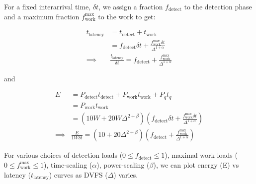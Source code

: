 For a fixed interarrival time, $\delta t$, we assign a fraction $f_{\text{detect}}$ to the detection phase and a maximum fraction $f_{\text{work}}^{\text{max}}$ to the work to get:

\begin{equation}
\begin{split}
    t_{\text{latency}} &= t_{\text{detect}} + t_{\text{work}} \\
    &= f_{\text{detect}}\delta t + \frac{f_{\text{work}}^{\text{max}}\delta t}{\Delta^{1+\alpha}}  \\
\implies & \boxed{\frac{t_{\text{latency}}}{\delta t} = f_{\text{detect}} + \frac{f_{\text{work}}^{\text{max}}}{\Delta^{1+\alpha}}}
\end{split}
\end{equation}

and

\begin{equation}
\begin{split}
    E &= P_\text{detect} t_{\text{detect}} + P_{\text{work}}  t_{\text{work}} + P_q t_q \\
    &= P_{\text{work}}  t_{\text{work}} \\
    &= (10W + 20W \Delta^{2+\beta}) (f_{\text{detect}}\delta t + \frac{f_{\text{work}}^{\text{max}}\delta t}{\Delta^{1+\alpha}}) \\
    \implies &\boxed{\frac{E}{1W \delta t} = (10 + 20 \Delta^{2+\beta})(f_{\text{detect}} + \frac{f_{\text{work}}^{\text{max}}}{\Delta^{1+\alpha}})}
\end{split}
\end{equation}

For various choices of detection loads ($0 \leq f_{\text{detect}} \leq 1$), maximal work loads ($0 \leq f_{\text{work}}^{\text{max}} \leq 1$), time-scaling ($\alpha$), power-scaling ($\beta$), we can plot energy (E) vs latency ($t_{\text{latency}}$) curves as DVFS ($\Delta$) varies.

